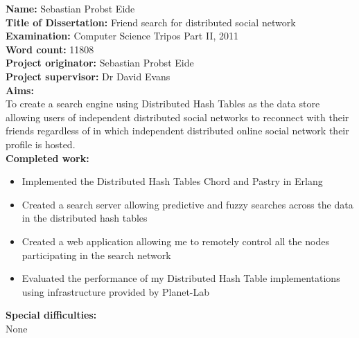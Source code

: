 \begin{flushleft}{

  \textbf{Name:} Sebastian Probst Eide \\
  \vspace*{5mm}
  \textbf{Title of Dissertation:} Friend search for distributed social network \\
  \vspace*{5mm}
  \textbf{Examination:} Computer Science Tripos Part II, 2011 \\
  \vspace*{5mm}
  \textbf{Word count:} 11808 \\
  \vspace*{5mm}
  \textbf{Project originator:} Sebastian Probst Eide \\
  \vspace*{5mm}
  \textbf{Project supervisor:} Dr David Evans \\
  \vspace*{15mm}
  \textbf{Aims:} \\
  \vspace*{2mm}
  To create a search engine using Distributed Hash Tables as the data store allowing users of independent distributed social networks to reconnect with their friends regardless of in which independent distributed online social network their profile is hosted. \\
  \vspace*{10mm}
  \textbf{Completed work:} \\
  \vspace*{2mm}
  \begin{itemize}
  \item Implemented the Distributed Hash Tables Chord and Pastry in Erlang
  \item Created a search server allowing predictive and fuzzy searches across the data in the distributed hash tables
  \item Created a web application allowing me to remotely control all the nodes participating in the search network
  \item Evaluated the performance of my Distributed Hash Table implementations using infrastructure provided by Planet-Lab
  \end{itemize}
  \vspace*{10mm}
  \textbf{Special difficulties:} \\
  \vspace*{2mm}
  None

} \end{flushleft}

\clearpage
